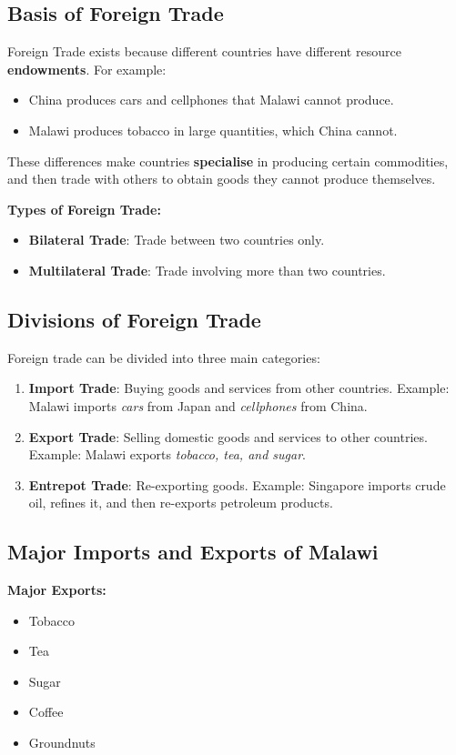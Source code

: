 \documentclass[12pt,a4paper, openany]{book}
\begin{document}
\subsection{Basis of Foreign Trade}
Foreign Trade exists because different countries have different resource \textbf{endowments}.
For example:
\begin{itemize}
	\item China produces cars and cellphones that Malawi cannot produce.
	\item Malawi produces tobacco in large quantities, which China cannot.
\end{itemize}

These differences make countries \textbf{specialise} in producing certain commodities, and then trade with others to obtain goods they cannot produce themselves.

\textbf{Types of Foreign Trade:}
\begin{itemize}
	\item \textbf{Bilateral Trade}: Trade between two countries only.
	\item \textbf{Multilateral Trade}: Trade involving more than two countries.
\end{itemize}

\subsection{Divisions of Foreign Trade}
Foreign trade can be divided into three main categories:

\begin{enumerate}
	\item \textbf{Import Trade}: Buying goods and services from other countries.
	      Example: Malawi imports \textit{cars} from Japan and \textit{cellphones} from China.

	\item \textbf{Export Trade}: Selling domestic goods and services to other countries.
	      Example: Malawi exports \textit{tobacco, tea, and sugar}.

	\item \textbf{Entrepot Trade}: Re-exporting goods.
	      Example: Singapore imports crude oil, refines it, and then re-exports petroleum products.
\end{enumerate}

\subsection{Major Imports and Exports of Malawi}
\textbf{Major Exports:}
\begin{itemize}
	\item Tobacco
	\item Tea
	\item Sugar
	\item Coffee
	\item Groundnuts
\end{itemize}
\end{document}
